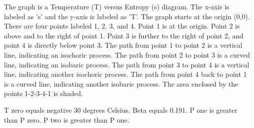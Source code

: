 The graph is a Temperature (T) versus Entropy (s) diagram. The x-axis is labeled as 's' and the y-axis is labeled as 'T'. The graph starts at the origin (0,0). There are four points labeled 1, 2, 3, and 4. Point 1 is at the origin. Point 2 is above and to the right of point 1. Point 3 is further to the right of point 2, and point 4 is directly below point 3. The path from point 1 to point 2 is a vertical line, indicating an isochoric process. The path from point 2 to point 3 is a curved line, indicating an isobaric process. The path from point 3 to point 4 is a vertical line, indicating another isochoric process. The path from point 4 back to point 1 is a curved line, indicating another isobaric process. The area enclosed by the points 1-2-3-4-1 is shaded.

T zero equals negative 30 degrees Celsius.
Beta equals 0.191.
P one is greater than P zero.
P two is greater than P one.